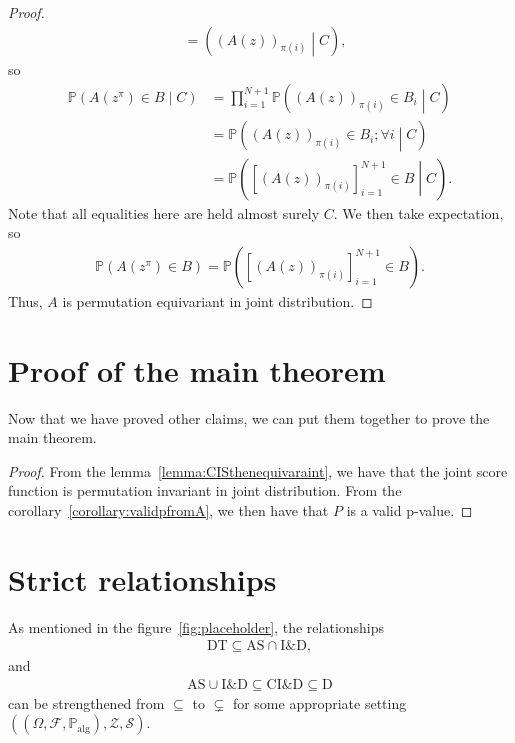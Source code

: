 \documentclass{article}
\newcommand{\prob}[1]{\mathbb{P}\left( #1 \right)}
\newcommand{\cprob}[2]{\mathbb{P}\left( #1 \middle\vert #2 \right)}
\newcommand{\oo}[1]{\left( #1 \right)}
\newcommand{\cc}[1]{\left[ #1 \right]}
\begin{document}
\begin{proof}
\begin{align*}
                &=
                \left(
                \oo{A(z)}_{\pi(i)}
                \middle\vert C\right),
            \end{align*}
            so
            \begin{align*}
                \cprob{A\left(z^\pi\right) \in B}{C}
                &=
                \prod_{i=1}^{N+1}
                \cprob{(A(z))_{\pi(i)} \in B_i}{C}\\
                &=
                \cprob{(A(z))_{\pi(i)} \in B_i;
                \forall i}{C}\\
                &=
                \cprob{\cc{(A(z))_{\pi(i)}}_{i=1}^{N+1} \in B}{C}.
            \end{align*}
            Note that all equalities here are held almost surely $C$. We then take expectation, so
            \begin{align*}
                \prob{A\left(z^\pi\right) \in B}
                =\prob{\cc{(A(z))_{\pi(i)}}_{i=1}^{N+1} \in B}.
            \end{align*}
            Thus, $A$ is permutation equivariant in joint distribution.
        \end{proof}

\section{Proof of the main theorem}
\label{appendix:proof}
    Now that we have proved other claims, we can put them together to prove the main theorem.
    \begin{proof}
         From the lemma~\ref{lemma:CISthenequivaraint}, we have that the joint score function is permutation invariant in joint distribution. From the corollary~\ref{corollary:validpfromA}, we then have that $P$ is a valid p-value.
    \end{proof}

\section{Strict relationships}

As mentioned in the figure~\ref{fig:placeholder}, the relationships
\begin{align*}
    \text{DT} \subseteq \text{AS} \cap \text{I\&D},
\end{align*}
and 
\begin{align*}
    \text{AS} \cup \text{I\&D} \subseteq \text{CI\&D} \subseteq \text{D}
\end{align*}
can be strengthened from $\subseteq$ to $\subsetneq$ for some appropriate setting $\oo{\oo{\Omega, \mathcal{F}, \mathbb{P}_{\text{alg}}}, \mathcal{Z}, \mathcal{S}}$.
\end{document}
